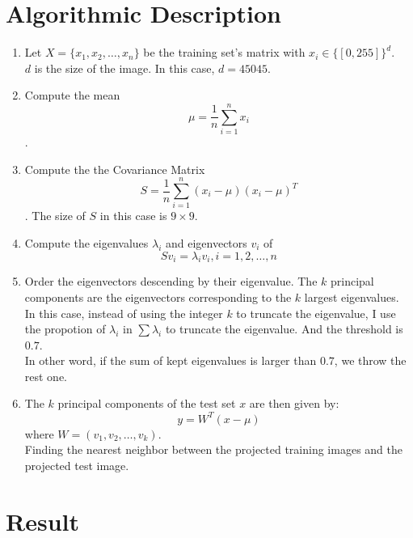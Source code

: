 \documentclass[letterpaper]{polythesis}
\begin{document}
\chapter{Algorithmic Description}
\label{ch-2}


\begin{enumerate}[step 1]
\item Let $X = \{ x_{1}, x_{2}, \ldots, x_{n} \}$ be the
      training set's matrix with $x_i \in \{[0, 255]\}^{d}$.\\
      $d$ is the size of the image. In this case, $d = 45045$.
\item Compute the mean $$\mu = \frac{1}{n} \sum_{i=1}^{n} x_{i}$$.
\item Compute the the Covariance Matrix
      $$S = \frac{1}{n} \sum_{i=1}^{n} (x_{i} - \mu) (x_{i} - \mu)^T$$.
      The size of $S$ in this case is $9\times 9$.
\item Compute the eigenvalues $\lambda_{i}$ and eigenvectors $v_{i}$ of $$
S v_{i} = \lambda_{i} v_{i}, i=1,2,\ldots,n$$
\item Order the eigenvectors descending by their eigenvalue.
      The $k$ principal components are the eigenvectors corresponding to
      the $k$ largest eigenvalues. \\
      In this case, instead of using the integer $k$ to truncate the eigenvalue,
      I use the propotion of $\lambda_i$ in $\sum \lambda_i$ to truncate the
      eigenvalue. And the threshold is $0.7$. \\
      In other word, if the sum of kept eigenvalues is larger than $0.7$, we throw
      the rest one.
\item The $k$ principal components of the test set $x$ are then given by:
      $$y = W^{T} (x - \mu)$$
      where $W = (v_{1}, v_{2}, \ldots, v_{k})$.\\
      Finding the nearest neighbor between the projected training images and
      the projected test image.
\end{enumerate}


\chapter{Result}
\label{ch-3}
\end{document}
